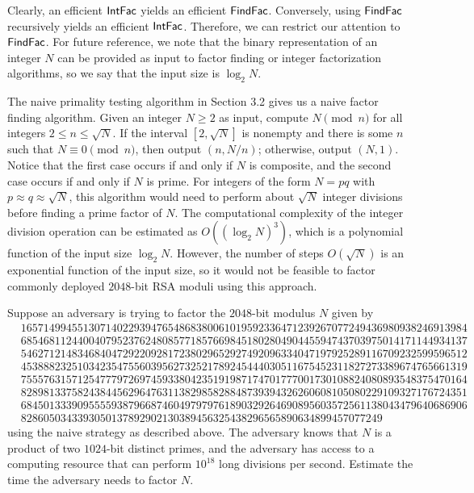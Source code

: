 Clearly, an efficient ${\sf IntFac}$ yields an efficient ${\sf FindFac}$. Conversely, using
${\sf FindFac}$ recursively yields an efficient ${\sf IntFac}$. Therefore, we can restrict
our attention to ${\sf FindFac}$. For future reference, we note that the binary 
representation of an integer $N$ can be provided as input to factor finding 
or integer factorization algorithms, so we say that the input size is $\log_2 N$. 

The naive primality testing algorithm in Section 3.2 gives us a naive factor 
finding algorithm. Given an integer $N \geq 2$ as input, compute $N \pmod n$
for all integers $2 \leq n \leq \sqrt N$. If the interval $[2, \sqrt N]$ is 
nonempty and there is some $n$ such that $N \equiv 0 \pmod n$, then output 
$(n, N/n)$; otherwise, output $(N, 1)$. Notice that the first case occurs 
if and only if $N$ is composite, and the second case occurs if and only if 
$N$ is prime. For integers of the form $N = pq$ 
with $p \approx q \approx \sqrt N$, this algorithm would need to perform 
about $\sqrt N$ integer divisions before finding a prime factor of $N$. 
The computational complexity of the integer division operation can be 
estimated as $O((\log_2 N)^3)$, which is a polynomial function of the input 
size $\log_2 N$. However, the number of steps $O(\sqrt N)$ is an exponential 
function of the input size, so it would not be feasible to factor commonly 
deployed $2048$-bit RSA moduli using this approach. 

\begin{exercise}
    Suppose an adversary is trying to factor the $2048$-bit modulus $N$ given by 
    \begin{align*}
        & 1657149945513071402293947654868380061019592336471239267077249436980938246913984 \\
        & 6854681124400407952376248085771857669845180280490445594743703975014171144934137 \\
        & 5462712148346840472922092817238029652927492096334047197925289116709232599596512 \\
        & 4538882325103423547556039562732521789245444030511675452311827273389674765661319 \\ 
        & 7555763157125477797269745933804235191987174701777001730108824080893548375470164 \\ 
        & 8289813375824384456296476311382985828848739394326260608105080229109327176724351 \\ 
        & 6845013339095555938796687460497979761890329264690895603572561138043479640686906 \\ 
        & 8286050343393050137892902130389456325438296565890634899457077249
    \end{align*}
    using the naive strategy as described above. The adversary knows that $N$ 
    is a product of two $1024$-bit distinct primes, and the adversary has access
    to a computing resource that can perform $10^{18}$ long divisions per second. 
    Estimate the time the adversary needs to factor $N$.
\end{exercise}

